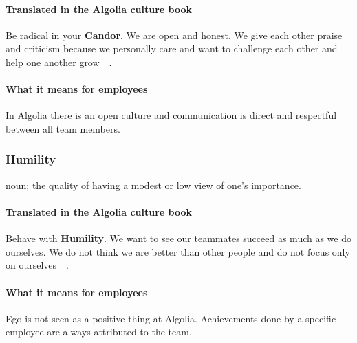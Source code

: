 
\paragraph{Translated in the Algolia culture book}

Be radical in your \textbf{Candor}. We are open and honest. We give each other praise and criticism because we personally care and want to challenge each other and help one another grow~\cite{algolia-careers}~.

\paragraph{What it means for employees} 

In Algolia there is an open culture and communication is direct and respectful between all team members. %

\subsubsection{Humility}
\label{ssub:humility}

\begin{definition}
noun; the quality of having a modest or low view of one's importance.
\end{definition}


\paragraph{Translated in the Algolia culture book}

Behave with \textbf{Humility}. We want to see our teammates succeed as much as we do ourselves. We do not think we are better than other people and do not focus only on ourselves~\cite{algolia-careers}~.

\paragraph{What it means for employees} 

Ego is not seen as a positive thing at Algolia. Achievements done by a specific employee are always attributed to the team.

